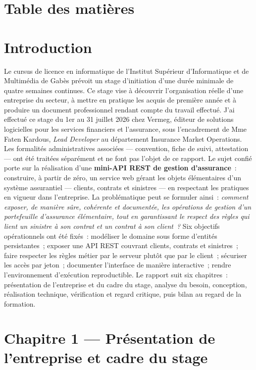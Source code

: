 \documentclass[12pt,a4paper]{report}
\begin{document}
\chapter*{Table des matières}
\tableofcontents
\listoffigures
\listoftables
{}
\newpage
\chapter*{Introduction}
Le cursus de licence en informatique de l'Institut Supérieur d'Informatique et de Multimédia de Gabès prévoit un stage d'initiation d'une durée minimale de quatre semaines continues. Ce stage vise à découvrir l'organisation réelle d'une entreprise du secteur, à mettre en pratique les acquis de première année et à produire un document professionnel rendant compte du travail effectué.
J'ai effectué ce stage du 1er au 31 juillet 2026 chez Vermeg, éditeur de solutions logicielles pour les services financiers et l'assurance, sous l'encadrement de Mme Faten Kardous, \textit{Lead Developer} au département Insurance Market Operations. Les formalités administratives associées — convention, fiche de suivi, attestation — ont été traitées séparément et ne font pas l'objet de ce rapport.
Le sujet confié porte sur la réalisation d'une \textbf{mini-API REST de gestion d'assurance}~: construire, à partir de zéro, un service web gérant les objets élémentaires d'un système assurantiel — clients, contrats et sinistres — en respectant les pratiques en vigueur dans l'entreprise. La problématique peut se formuler ainsi~: \textit{comment exposer, de manière sûre, cohérente et documentée, les opérations de gestion d'un portefeuille d'assurance élémentaire, tout en garantissant le respect des règles qui lient un sinistre à son contrat et un contrat à son client~?}
Six objectifs opérationnels ont été fixés~: modéliser le domaine sous forme d'entités persistantes~; exposer une API REST couvrant clients, contrats et sinistres~; faire respecter les règles métier par le serveur plutôt que par le client~; sécuriser les accès par jeton~; documenter l'interface de manière interactive~; rendre l'environnement d'exécution reproductible.
Le rapport suit six chapitres~: présentation de l'entreprise et du cadre du stage, analyse du besoin, conception, réalisation technique, vérification et regard critique, puis bilan au regard de la formation.
\newpage
\chapter*{Chapitre 1 — Présentation de l'entreprise et cadre du stage}
\end{document}
